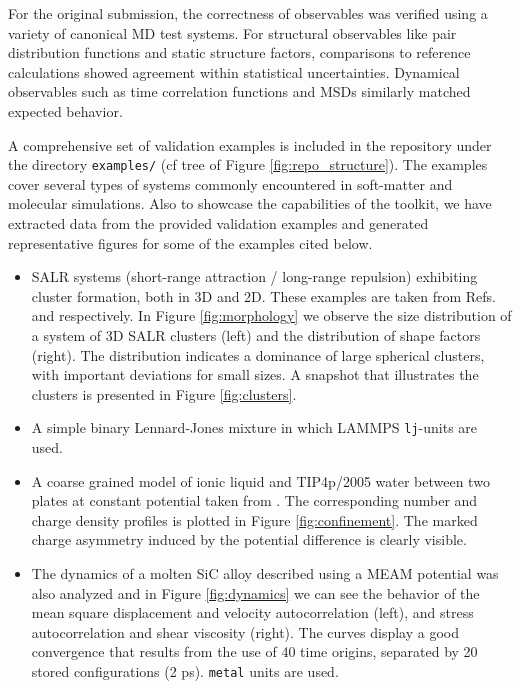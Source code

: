 \documentclass[final,1p,times]{elsarticle}
\begin{document}
For the original submission, the correctness of observables was verified using a variety of canonical MD test
systems. For structural observables like pair distribution functions
and static structure factors, comparisons to reference calculations
showed agreement within statistical uncertainties. Dynamical
observables such as time correlation functions and MSDs similarly
matched expected behavior.  

A comprehensive set of validation examples is included in the
repository under the directory \texttt{examples/} (cf tree of Figure
\ref{fig:repo_structure}). The examples cover several types of systems
commonly encountered in soft-matter and molecular simulations. Also to
showcase the capabilities of the toolkit, we have extracted data from
the provided validation examples and generated representative figures
for some of the examples cited below. 

\begin{itemize}
\item SALR systems (short-range attraction / long-range repulsion)
  exhibiting cluster formation, both in 3D and 2D. These examples are
  taken from Refs. \cite{DiazPozuelo202y5} and \cite{Bores2026}
  respectively. In Figure \ref{fig:morphology} we observe the size
  distribution of a system of 3D SALR clusters (left) and the
  distribution of shape factors (right). The distribution indicates a
  dominance of large spherical clusters, with important deviations
  for small sizes. A snapshot that illustrates the clusters is
  presented in Figure \ref{fig:clusters}.

\item A simple binary Lennard-Jones mixture in which LAMMPS {\tt lj}-units are used.


\item A coarse grained model of ionic liquid and TIP4p/2005 water
  between two plates at constant potential taken from
  \cite{Lomba2024}. The corresponding number and charge density
  profiles is plotted in Figure \ref{fig:confinement}. The marked
  charge asymmetry induced by the potential difference is clearly
  visible. 

\item The dynamics of a molten SiC alloy described using a MEAM potential
  \cite{Baskes1992} was also analyzed and in Figure
  \ref{fig:dynamics} we can see the behavior of the mean square
  displacement and velocity autocorrelation (left), and stress
  autocorrelation and shear viscosity (right). The curves display a good
  convergence that results from the  use of 40 time origins, separated by 20
  stored configurations (2 ps). {\tt metal} units are used.

\end{itemize}
\end{document}
